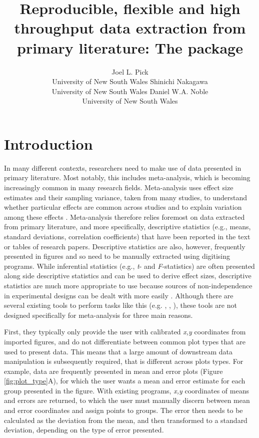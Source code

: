 \documentclass[article]{jss}
\author{Joel L. Pick\\University of New South Wales
   \And Shinichi Nakagawa\\University of New South Wales
   \AND Daniel W.A. Noble\\University of New South Wales
   }
\title{Reproducible, flexible and high throughput data extraction from primary literature: The \pkg{metaDigitise} \proglang{R} package}
\begin{document}



\section{Introduction}

In many different contexts, researchers need to make use of data presented in primary literature. Most notably, this includes meta-analysis, which is becoming increasingly common in many research fields. Meta-analysis uses effect size estimates and their sampling variance, taken from many studies, to understand whether particular effects are common across studies and to explain variation among these effects \citep{Glass1976,Borenstein2009,Koricheva2013,Naka2017}. Meta-analysis therefore relies foremost on data extracted from primary literature, and more specifically, descriptive statistics (e.g., means, standard deviations, correlation coefficients) that have been reported in the text or tables of research papers. Descriptive statistics are also, however, frequently presented in figures and so need to be manually extracted using digitising programs. While inferential statistics (e.g., \textit{t}- and \textit{F}-statistics) are often presented along side descriptive statistics and can be used to derive effect sizes, descriptive statistics are much more appropriate to use because sources of non-independence in experimental designs can be dealt with more easily \citep{Noble2017}. Although there are several existing tools to perform tasks like this (e.g.  \citep{DataThief},  \citep{GraphClick},  \citep{WebPlotDigitizer}), these tools are not designed specifically for meta-analysis for three main reasons. 

First, they typically only provide the user with calibrated \textit{x,y} coordinates from imported figures, and do not differentiate between common plot types that are used to present data. This means that a large amount of downstream data manipulation is subsequently required, that is different across plots types. For example, data are frequently presented in mean and error plots (Figure \ref{fig:plot_type}A), for which the user wants a mean and error estimate for each group presented in the figure. With existing programs, \textit{x,y} coordinates of means and errors are returned, to which the user must manually discern between mean and error coordinates and assign points to groups. The error then needs to be calculated as the deviation from the mean, and then transformed to a standard deviation, depending on the type of error presented.
\end{document}
